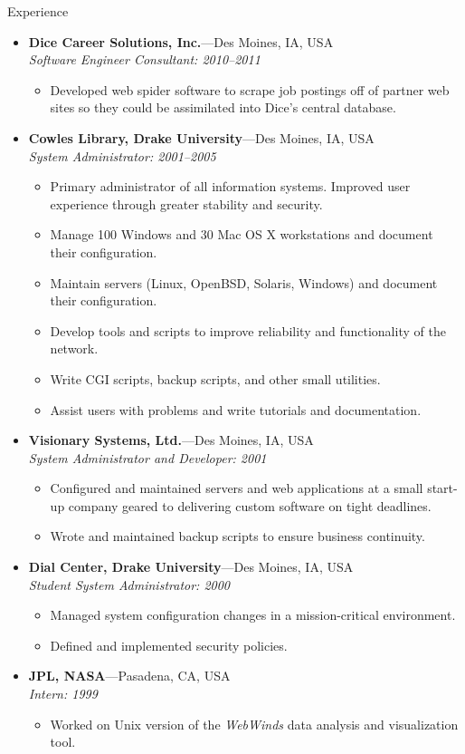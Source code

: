 \documentclass[11pt,oneside,a4paper]{article}
\newenvironment{ressection}[1]{
	\vspace{4pt}
	{\large#1} %
	\begin{itemize}
	\vspace{3pt}
}{
	\end{itemize}
}
\newcommand{\ressubitem}[1]{
	\vspace{-1pt} %
	\item \begin{flushleft} #1 \end{flushleft}
}
\newcommand{\resbigitem}[3]{
	\vspace{-5pt}
	\item
	\textbf{#1}---#2 \\
	\textit{#3}
}
\newenvironment{ressubsec}[3]{
	\resbigitem{#1}{#2}{#3}
	\vspace{-2pt}
	\begin{itemize}
}{
	\end{itemize}
}
\begin{document}
\begin{ressection}{Experience}
	\begin{ressubsec}{Dice Career Solutions, Inc.}{Des Moines, IA, USA}{Software Engineer Consultant: 2010--2011}
		\ressubitem{Developed web spider software to scrape job postings off of partner web sites so they could be assimilated into Dice's central database.}
	\end{ressubsec}

	\begin{ressubsec}{Cowles Library, Drake University}{Des Moines, IA, USA}{System Administrator: 2001--2005}
		\ressubitem{Primary administrator of all information systems. Improved user experience through greater stability and security.}
		\ressubitem{Manage 100 Windows and 30 Mac OS X workstations and document their configuration.}
		\ressubitem{Maintain servers (Linux, OpenBSD, Solaris, Windows) and document their configuration.}
		\ressubitem{Develop tools and scripts to improve reliability and functionality of the network.}
		\ressubitem{Write CGI scripts, backup scripts, and other small utilities.}
		\ressubitem{Assist users with problems and write tutorials and documentation.}
	\end{ressubsec}

	\begin{ressubsec}{Visionary Systems, Ltd.}{Des Moines, IA, USA}{System Administrator and Developer: 2001}
		\ressubitem{Configured and maintained servers and web applications at a small start-up company geared to delivering custom software on tight deadlines.}
		\ressubitem{Wrote and maintained backup scripts to ensure business continuity.}
	\end{ressubsec}

	\begin{ressubsec}{Dial Center, Drake University}{Des Moines, IA, USA}{Student System Administrator: 2000}
		\ressubitem{Managed system configuration changes in a mission-critical environment.}
		\ressubitem{Defined and implemented security policies.}
	\end{ressubsec}

	\begin{ressubsec}{JPL, NASA}{Pasadena, CA, USA}{Intern: 1999}
		\ressubitem{Worked on Unix version of the \emph{WebWinds} data analysis and visualization tool.}
	\end{ressubsec}

\end{ressection}
\end{document}
